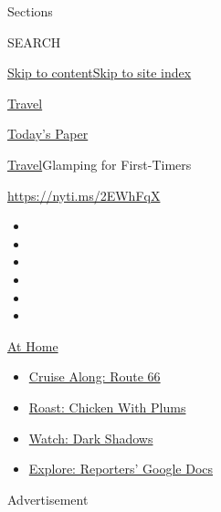 Sections

SEARCH

\protect\hyperlink{site-content}{Skip to
content}\protect\hyperlink{site-index}{Skip to site index}

\href{https://www.nytimes3xbfgragh.onion/section/travel}{Travel}

\href{https://myaccount.nytimes3xbfgragh.onion/auth/login?response_type=cookie\&client_id=vi}{}

\href{https://www.nytimes3xbfgragh.onion/section/todayspaper}{Today's
Paper}

\href{/section/travel}{Travel}\textbar{}Glamping for First-Timers

\url{https://nyti.ms/2EWhFqX}

\begin{itemize}
\item
\item
\item
\item
\item
\item
\end{itemize}

\href{https://www.nytimes3xbfgragh.onion/spotlight/at-home?action=click\&pgtype=Article\&state=default\&region=TOP_BANNER\&context=at_home_menu}{At
Home}

\begin{itemize}
\tightlist
\item
  \href{https://www.nytimes3xbfgragh.onion/2020/09/07/travel/route-66.html?action=click\&pgtype=Article\&state=default\&region=TOP_BANNER\&context=at_home_menu}{Cruise
  Along: Route 66}
\item
  \href{https://www.nytimes3xbfgragh.onion/2020/09/04/dining/sheet-pan-chicken.html?action=click\&pgtype=Article\&state=default\&region=TOP_BANNER\&context=at_home_menu}{Roast:
  Chicken With Plums}
\item
  \href{https://www.nytimes3xbfgragh.onion/2020/09/04/arts/television/dark-shadows-stream.html?action=click\&pgtype=Article\&state=default\&region=TOP_BANNER\&context=at_home_menu}{Watch:
  Dark Shadows}
\item
  \href{https://www.nytimes3xbfgragh.onion/interactive/2020/at-home/even-more-reporters-editors-diaries-lists-recommendations.html?action=click\&pgtype=Article\&state=default\&region=TOP_BANNER\&context=at_home_menu}{Explore:
  Reporters' Google Docs}
\end{itemize}

Advertisement

